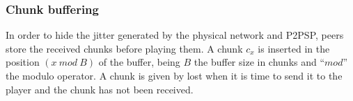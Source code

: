 
\subsubsection{Chunk buffering}
In order to hide the jitter generated by the physical network and
P2PSP, peers store the received chunks before playing them. A chunk
$c_x$ is inserted in the position $(x~\mathit{mod}~B)$ of the buffer,
being $B$ the buffer size in chunks and ``$\mathit{mod}$'' the modulo
operator. A chunk is given by lost when it is time to send it to the
player and the chunk has not been received.


